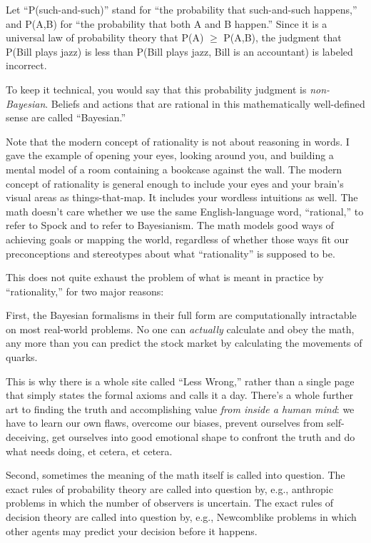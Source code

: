 {
 Let ``P(such-and-such)'' stand
for ``the probability that such-and-such
happens,'' and P(A,B) for ``the
probability that both A and B happen.'' Since it is a
universal law of probability theory that P(A) ${\geq}$ P(A,B), the
judgment that P(Bill plays jazz) is less than P(Bill plays jazz, Bill
is an accountant) is labeled incorrect.}

{
 To keep it technical, you would say that this probability judgment
is \textit{non-Bayesian}. Beliefs and actions that are rational in this
mathematically well-defined sense are called
``Bayesian.''}

{
 Note that the modern concept of rationality is not about reasoning
in words. I gave the example of opening your eyes, looking around you,
and building a mental model of a room containing a bookcase against the
wall. The modern concept of rationality is general enough to include
your eyes and your brain's visual areas as
things-that-map. It includes your wordless intuitions as well. The math
doesn't care whether we use the same English-language
word, ``rational,'' to refer to
Spock and to refer to Bayesianism. The math models good ways of
achieving goals or mapping the world, regardless of whether those ways
fit our preconceptions and stereotypes about what
``rationality'' is supposed to be.}

{
 This does not quite exhaust the problem of what is meant in
practice by ``rationality,'' for two
major reasons:}

{
 First, the Bayesian formalisms in their full form are
computationally intractable on most real-world problems. No one can
\textit{actually} calculate and obey the math, any more than you can
predict the stock market by calculating the movements of quarks.}

{
 This is why there is a whole site called ``Less
Wrong,'' rather than a single page that simply states
the formal axioms and calls it a day. There's a whole
further art to finding the truth and accomplishing value \textit{from
inside a human mind}: we have to learn our own flaws, overcome our
biases, prevent ourselves from self-deceiving, get ourselves into good
emotional shape to confront the truth and do what needs doing, et
cetera, et cetera.}

{
 Second, sometimes the meaning of the math itself is called into
question. The exact rules of probability theory are called into
question by, e.g., anthropic problems in which the number of observers
is uncertain. The exact rules of decision theory are called into
question by, e.g., Newcomblike problems in which other agents may
predict your decision before it happens.}


